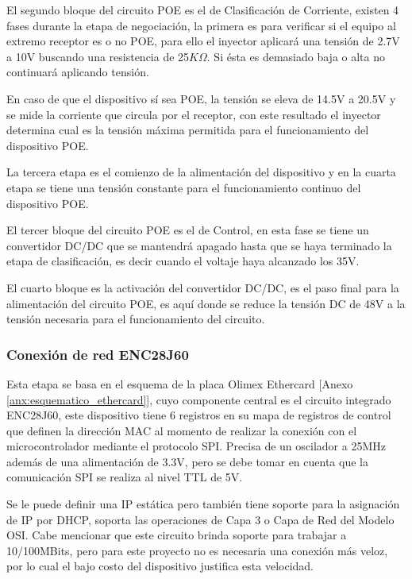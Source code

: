\documentclass[../principal]{subfiles}
\begin{document}
  El segundo bloque del circuito POE es el de Clasificación de Corriente, existen 4 fases durante la etapa de negociación, la primera es para verificar si el equipo al extremo receptor es o no POE, para ello el inyector aplicará una tensión de 2.7V a 10V buscando una resistencia de 25$ K\Omega $. Si ésta es demasiado baja o alta no continuará aplicando tensión.

  En caso de que el dispositivo sí sea POE, la tensión se eleva de 14.5V a 20.5V y se mide la corriente que circula por el receptor, con este resultado el inyector determina cual es la tensión máxima permitida para el funcionamiento del dispositivo POE.

  La tercera etapa es el comienzo de la alimentación del dispositivo y en la cuarta etapa se tiene una tensión constante para el funcionamiento continuo del dispositivo POE.

  El tercer bloque del circuito POE es el de Control, en esta fase se tiene un convertidor DC/DC \cite{datasheet:ep10} que se mantendrá apagado hasta que se haya terminado la etapa de clasificación, es decir cuando el voltaje haya alcanzado los 35V.

  El cuarto bloque es la activación del convertidor DC/DC, es el paso final para la alimentación del circuito POE, es aquí donde se reduce la tensión DC de 48V a la tensión necesaria para el funcionamiento del circuito.

  \subsubsection{Conexión de red ENC28J60}

  Esta etapa se basa en el esquema de la placa Olimex Ethercard [Anexo \ref{anx:esquematico_ethercard}], cuyo componente central es el circuito integrado ENC28J60, este dispositivo tiene 6 registros en su mapa de registros de control que definen la dirección MAC al momento de realizar la conexión con el microcontrolador mediante el protocolo SPI. Precisa de un oscilador a 25MHz además de una alimentación de 3.3V, pero se debe tomar en cuenta que la comunicación SPI se realiza al nivel TTL de 5V.

  Se le puede definir una IP estática pero también tiene soporte para la asignación de IP por DHCP, soporta las operaciones de Capa 3 o Capa de Red del Modelo OSI. Cabe mencionar que este circuito brinda soporte para trabajar a 10/100MBits, pero para este proyecto no es necesaria una conexión más veloz, por lo cual el bajo costo del dispositivo justifica esta velocidad.
\end{document}
